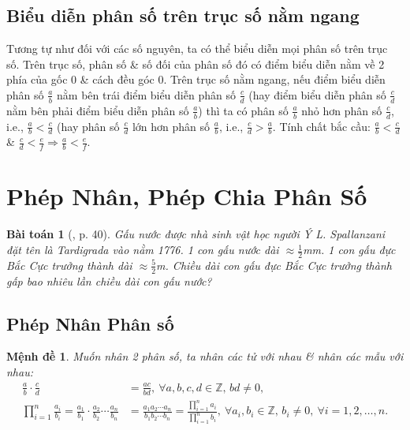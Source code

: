\documentclass{article}
\newtheorem{baitoan}{Bài toán}
\newtheorem{menhde}{Mệnh đề}
\begin{document}
\subsection{Biểu diễn phân số trên trục số nằm ngang}
Tương tự như đối với các số nguyên, ta có thể biểu diễn mọi phân số trên trục số. Trên trục số, phân số \& số đối của phân số đó có điểm biểu diễn nằm về 2 phía của gốc 0 \& cách đều góc 0. Trên trục số nằm ngang, nếu điểm biểu diễn phân số $\frac{a}{b}$ nằm bên trái điểm biểu diễn phân số $\frac{c}{d}$ (hay điểm biểu diễn phân số $\frac{c}{d}$ nằm bên phải điểm biểu diễn phân số $\frac{a}{b}$) thì ta có phân số $\frac{a}{b}$ nhỏ hơn phân số $\frac{c}{d}$, i.e., $\frac{a}{b} < \frac{c}{d}$ (hay phân số $\frac{c}{d}$ lớn hơn phân số $\frac{a}{b}$, i.e., $\frac{c}{d} > \frac{a}{b}$. Tính chất bắc cầu: $\frac{a}{b} < \frac{c}{d}$ \& $\frac{c}{d} < \frac{e}{f}\Rightarrow\frac{a}{b} < \frac{e}{f}$.


\section{Phép Nhân, Phép Chia Phân Số}

\begin{baitoan}[\cite{SGK_Toan_6_Canh_Dieu_tap_2}, p. 40]
	Gấu nước được nhà sinh vật học người Ý L. Spallanzani đặt tên là Tardigrada vào nằm 1776. 1 con gấu nước dài $\approx\frac{1}{2}$\emph{mm}. 1 con gấu đực Bắc Cực trưởng thành dài $\approx\frac{5}{2}$\emph{m}. Chiều dài con gấu đực Bắc Cực trưởng thành gấp bao nhiêu lần chiều dài con gấu nước?
\end{baitoan}

\subsection{Phép Nhân Phân số}

\begin{menhde}
	Muốn nhân 2 phân số, ta nhân các tử với nhau \& nhân các mẫu với nhau:
	\begin{align*}
		\frac{a}{b}\cdot\frac{c}{d} &= \frac{ac}{bd},\ \forall a,b,c,d\in\mathbb{Z},\,bd\ne0,\\
		\prod_{i=1}^n \frac{a_i}{b_i} = \frac{a_1}{b_1}\cdot\frac{a_2}{b_2}\cdots\frac{a_n}{b_n} &= \frac{a_1a_2\cdots a_n}{b_1b_2\cdots b_n} = \frac{\prod_{i=1}^n a_i}{\prod_{i=1}^n b_i},\ \forall a_i,b_i\in\mathbb{Z},\,b_i\ne0,\ \forall i = 1,2,\ldots,n.
	\end{align*}
\end{menhde}
\end{document}
